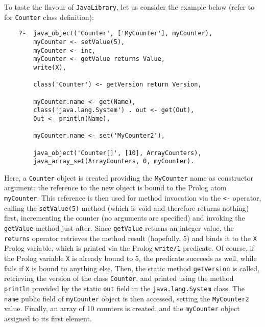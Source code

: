 To taste the flavour of \texttt{JavaLibrary}, let us consider the
example below (refer to  for \texttt{Counter}
class definition):

%
{\small
\begin{verbatim}
    ?-  java_object('Counter', ['MyCounter'], myCounter),
        myCounter <- setValue(5),
        myCounter <- inc,
        myCounter <- getValue returns Value,
        write(X),

        class('Counter') <- getVersion return Version,

        myCounter.name <- get(Name),
        class('java.lang.System') . out <- get(Out),
        Out <- println(Name),

        myCounter.name <- set('MyCounter2'),

        java_object('Counter[]', [10], ArrayCounters),
        java_array_set(ArrayCounters, 0, myCounter).
\end{verbatim}}
%
\noindent Here, a \texttt{Counter} object is created providing the
\texttt{MyCounter} name as constructor argument: the reference to
the new object is bound to the Prolog atom \texttt{myCounter}.
%
This reference is then used for method invocation via the
\texttt{<-} operator, calling the \texttt{setValue(5)} method
(which is void and therefore returns nothing) first, incrementing
the counter (no arguments are specified) and invoking the
\texttt{getValue} method just after.
%
Since \texttt{getValue} returns an integer value, the
\texttt{returns} operator retrieves the method result (hopefully,
5) and binds it to the \texttt{X} Prolog variable, which is
printed via the Prolog \texttt{write/1} predicate.
%
Of course, if the Prolog variable \texttt{X} is already bound to
5, the predicate succeeds as well, while fails if \texttt{X} is
bound to anything else.
%
Then, the static method \texttt{getVersion} is called, retrieving
the version of the class \texttt{Counter}, and printed using the
method \texttt{println} provided by the static \texttt{out} field
in the \texttt{java.lang.System} class.
%
The \texttt{name} public field of \texttt{myCounter} object is
then accessed, setting the \texttt{MyCounter2} value.
%
Finally, an array of 10 counters is created, and the
\texttt{myCounter} object assigned to its first element.
%

